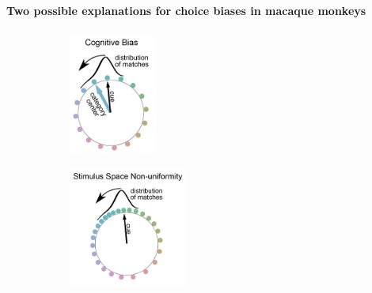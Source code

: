 \paragraph{Two possible explanations for choice biases in macaque monkeys}

\begin{figure}
    \centering

    \begin{subfigure}[t]{0.3\textwidth}
         \centering
         \caption{}
       \includegraphics[height=4cm]{../Figures/working/F3_TCCModel/a.png}
         \label{fig:TCCCartoonA}
    \end{subfigure}
    \begin{subfigure}[t]{0.3\textwidth}
         \centering
         \caption{}
       \includegraphics[height=4cm]{../Figures/working/F3_TCCModel/b.png}
         \label{fig:TCCCartoonB}
    \end{subfigure}
    
    \begin{subfigure}[t]{0.3\textwidth}
         \centering
         \caption{}
        
         \label{fig:TCCModel_og}
    \end{subfigure}
    \begin{subfigure}[t]{0.3\textwidth}
         \centering
         \caption{}
         
         \label{fig:TCCModel_ssnu}
    \end{subfigure}


\end{figure}
